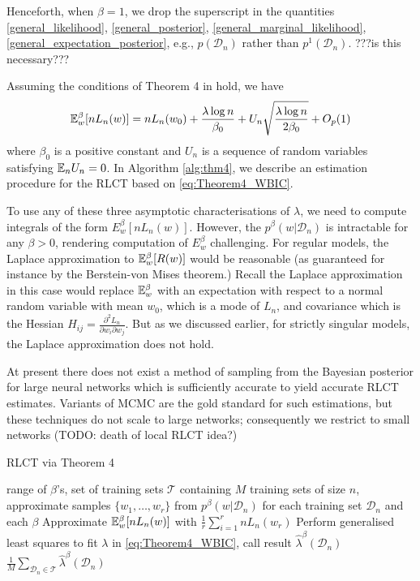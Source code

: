 \documentclass{article} %
\begin{document}
Henceforth, when $\beta = 1$, we drop the superscript in the quantities \ref{general_likelihood}, \ref{general_posterior}, \ref{general_marginal_likelihood}, \ref{general_expectation_posterior}, e.g., $p(\mathcal D_n)$ rather than $p^1(\mathcal D_n)$. ???is this necessary???


Assuming the conditions of Theorem 4 in \cite{watanabe_widely_2013} hold, we have
\begin{equation}
    {\mathbb{E}}_w^\beta [nL_n(w)] = nL_n(w_0) + \frac{\lambda \log n}{\beta_0} + U_n \sqrt{\frac{\lambda \log n}{2 \beta_0}} + O_p(1)
    \label{eq:Theorem4_WBIC}
\end{equation}
where $\beta_0$ is a positive constant and $U_n$ is a sequence of random variables satisfying ${\mathbb{E}}_n U_n = 0$. %
In Algorithm \ref{alg:thm4}, we describe an estimation procedure for the RLCT based on \eqref{eq:Theorem4_WBIC}.

To use any of these three asymptotic characterisations of $\lambda$, we need to compute integrals of the form $E_w^\beta [n L_n(w)]$. However, the $p^\beta(w|\mathcal D_n)$ is intractable for any $\beta>0$, rendering computation of $E_w^\beta$ challenging. For regular models, the Laplace approximation to ${\mathbb{E}}_w^\beta [R(w)]$ would be reasonable (as guaranteed for instance by the Berstein-von Mises theorem.) Recall the Laplace approximation in this case would replace ${\mathbb{E}}_w^\beta$ with an expectation with respect to a normal random variable with mean $w_0$, which is a mode of $L_n$, and covariance which is the Hessian $H_{ij} =\frac{\partial^2 L_n}{\partial w_i \partial w_j}$. But as we discussed earlier, for strictly singular models, the Laplace approximation does not hold. 

At present there does not exist a method of sampling from the Bayesian posterior for large neural networks which is sufficiently accurate to yield accurate RLCT estimates. Variants of MCMC are the gold standard for such estimations, but these techniques do not scale to large networks; consequently we restrict to small networks (TODO: death of local RLCT idea?)

\begin{algorithm}[tb]
	\caption{RLCT via Theorem 4}
	\label{alg:thm4}
	\begin{algorithmic}
		 range of $\beta$'s, set of training sets $\mathcal T$ containing $M$ training sets of size $n$, approximate samples $\{w_1,\ldots,w_r\}$ from $p^\beta(w|\mathcal D_n)$ for each training set $\mathcal D_n$ and each $\beta$
        		\STATE Approximate ${\mathbb{E}}_w^\beta [nL_n(w)]$ with $\frac{1}{r} \sum_{i=1}^r nL_n(w_r)$
    		\ENDFOR
    		\STATE Perform generalised least squares to fit $\lambda$ in \eqref{eq:Theorem4_WBIC}, call result $\hat \lambda^\beta(\mathcal D_n)$
		\ENDFOR
		 $\frac{1}{M} \sum_{\mathcal D_n \in \mathcal T} \hat \lambda^\beta(\mathcal D_n)$
	\end{algorithmic}
\end{algorithm}
\end{document}

